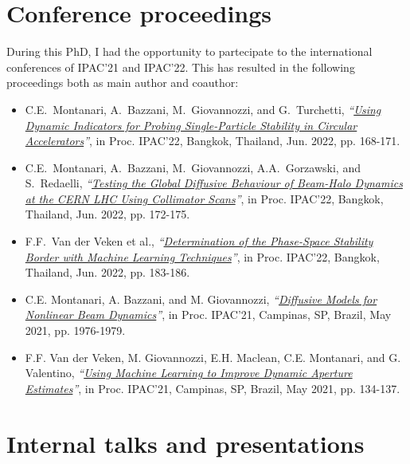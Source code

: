 \section*{Conference proceedings}

During this PhD, I had the opportunity to partecipate to the international conferences of IPAC'21 and IPAC'22. This has resulted in the following proceedings both as main author and coauthor:
 
\begin{itemize}
    \item C.E.\ Montanari, A.\ Bazzani, M.\ Giovannozzi, and G.\ Turchetti, \textit{``\href{
https://doi.org/10.18429/JACoW-IPAC2022-MOPOST042}{Using Dynamic Indicators for Probing Single-Particle Stability in Circular Accelerators}''}, in Proc. IPAC'22, Bangkok, Thailand, Jun. 2022, pp. 168-171.

    \item C.E.\ Montanari, A.\ Bazzani, M.\ Giovannozzi, A.A.\ Gorzawski, and S.\ Redaelli, \textit{``\href{https://doi.org/10.18429/JACoW-IPAC2022-MOPOST043}{Testing the Global Diffusive Behaviour of Beam-Halo Dynamics at the CERN LHC Using Collimator Scans}''}, in Proc. IPAC'22, Bangkok, Thailand, Jun. 2022, pp. 172-175.

    \item F.F.\ Van der Veken et al., \textit{``\href{https://doi.org/10.18429/JACoW-IPAC2022-MOPOST047}{Determination of the Phase-Space Stability Border with Machine Learning Techniques}''}, in Proc. IPAC'22, Bangkok, Thailand, Jun. 2022, pp. 183-186.

    \item C.E. Montanari, A. Bazzani, and M. Giovannozzi, \textit{``\href{https://doi.org/10.18429/JACoW-IPAC2021-TUPAB233}{Diffusive Models for Nonlinear Beam Dynamics}''}, in Proc. IPAC'21, Campinas, SP, Brazil, May 2021, pp. 1976-1979.

    \item F.F. Van der Veken, M. Giovannozzi, E.H. Maclean, C.E. Montanari, and G. Valentino, \textit{``\href{https://doi.org/10.18429/JACoW-IPAC2021-MOPAB028}{Using Machine Learning to Improve Dynamic Aperture Estimates}''}, in Proc. IPAC'21, Campinas, SP, Brazil, May 2021, pp. 134-137.
\end{itemize}

\section*{Internal talks and presentations}

